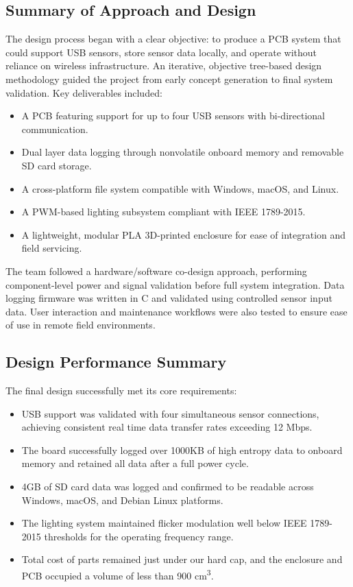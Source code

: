 \documentclass[12pt]{article}
\begin{document}
\subsection{Summary of Approach and Design}

\par The design process began with a clear objective: to produce a PCB system that could support USB sensors, store sensor data locally, and operate without reliance on wireless infrastructure. An iterative, objective tree-based design methodology guided the project from early concept generation to final system validation. Key deliverables included:

\begin{itemize}
\item A PCB featuring support for up to four USB sensors with bi-directional communication.
\item Dual layer data logging through nonvolatile onboard memory and removable SD card storage.
\item A cross-platform file system compatible with Windows, macOS, and Linux.
\item A PWM-based lighting subsystem compliant with IEEE 1789-2015.
\item A lightweight, modular PLA 3D-printed enclosure for ease of integration and field servicing.
\end{itemize}

\par The team followed a hardware/software co-design approach, performing component-level power and signal validation before full system integration. Data logging firmware was written in C and validated using controlled sensor input data. User interaction and maintenance workflows were also tested to ensure ease of use in remote field environments.

\subsection{Design Performance Summary}

The final design successfully met its core requirements:

\begin{itemize}
\item USB support was validated with four simultaneous sensor connections, achieving consistent real time data transfer rates exceeding 12 Mbps.
\item The board successfully logged over 1000KB of high entropy data to onboard memory and retained all data after a full power cycle.
\item 4GB of SD card data was logged and confirmed to be readable across Windows, macOS, and Debian Linux platforms.
\item The lighting system maintained flicker modulation well below IEEE 1789-2015 thresholds for the operating frequency range.
\item Total cost of parts remained just under our hard cap, and the enclosure and PCB occupied a volume of less than 900 cm\textsuperscript{3}.
\end{itemize}
\end{document}
